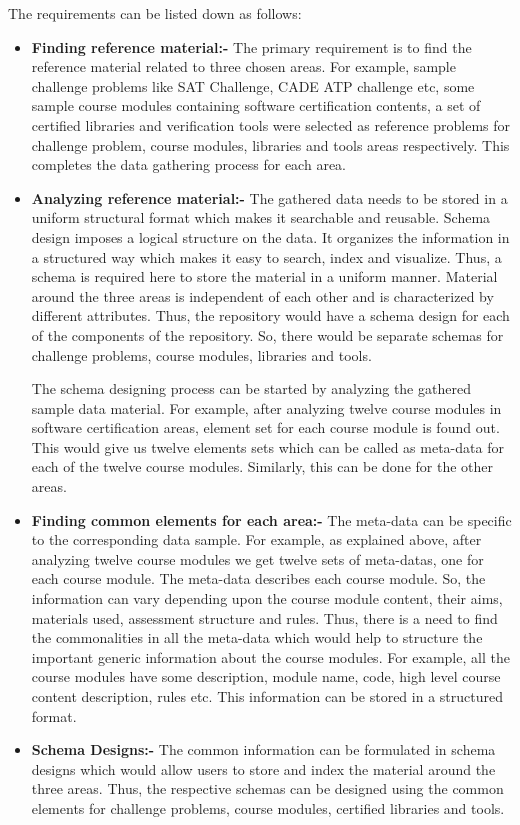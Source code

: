 \documentclass[11pt,letterpaper]{report}
\begin{document}
\noindent The requirements can be listed down as follows: 
\begin{itemize}
\item \textbf{Finding reference material:- } The primary requirement is to find the reference material related to three chosen areas. For example, sample challenge problems like SAT Challenge, CADE ATP challenge etc, some sample course modules containing software certification contents, a set of certified libraries and verification tools were selected as reference problems for challenge problem, course modules, libraries and tools areas respectively. This completes the data gathering process for each area. 
\item \textbf{Analyzing reference material:- } The gathered data needs to be stored in a uniform structural format which makes it searchable and reusable. Schema design imposes a logical structure on the data. It organizes the information in a structured way which makes it easy to search, index and visualize. Thus, a schema is required here to store the material in a uniform manner. Material around the three areas is independent of each other and is characterized by different attributes. Thus, the repository would have a schema design for each of the components of the repository. So, there would be separate schemas for challenge problems, course modules, libraries and tools. 

The schema designing process can be started by analyzing the gathered sample data material. For example, after analyzing twelve course modules in software certification areas, element set for each course module is found out. This would give us twelve elements sets which can be called as meta-data for each of the twelve course modules. Similarly, this can be done for the other areas. 
\item \textbf{Finding common elements for each area:- } The meta-data can be specific to the corresponding data sample. For example, as explained above, after analyzing twelve course modules we get twelve sets of meta-datas, one for each course module. The meta-data describes each course module. So, the information can vary depending upon the course module content, their aims, materials used, assessment structure and rules. Thus, there is a need to find the commonalities in all the meta-data which would help to structure the important generic information about the course modules. For example, all the course modules have some description, module name, code, high level course content description, rules etc. This information can be stored in a structured format. 
\item \textbf{Schema Designs:- } The common information can be formulated in schema designs which would allow users to store and index the material around the three areas. Thus, the respective schemas can be designed using the common elements for challenge problems, course modules, certified libraries and tools.     
\end{itemize} 
\end{document}
